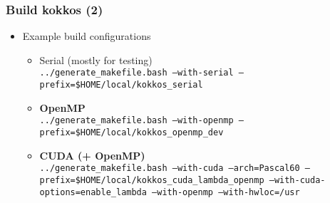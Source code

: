 \begin{frame}
  \frametitle{Build kokkos (2)}

  \begin{itemize}
  \item Example build configurations
    \begin{itemize}
    \item Serial (mostly for testing)\\
      \texttt{../generate\_makefile.bash --with-serial --prefix=\$HOME/local/kokkos\_serial}
    \item \textbf{OpenMP}\\
      \texttt{../generate\_makefile.bash --with-openmp --prefix=\$HOME/local/kokkos\_openmp\_dev}
    \item \textbf{CUDA (+ OpenMP)}\\
      \texttt{../generate\_makefile.bash --with-cuda --arch=Pascal60 --prefix=\$HOME/local/kokkos\_cuda\_lambda\_openmp --with-cuda-options=enable\_lambda --with-openmp --with-hwloc=/usr}
    \end{itemize}
  \end{itemize}
  
\end{frame}